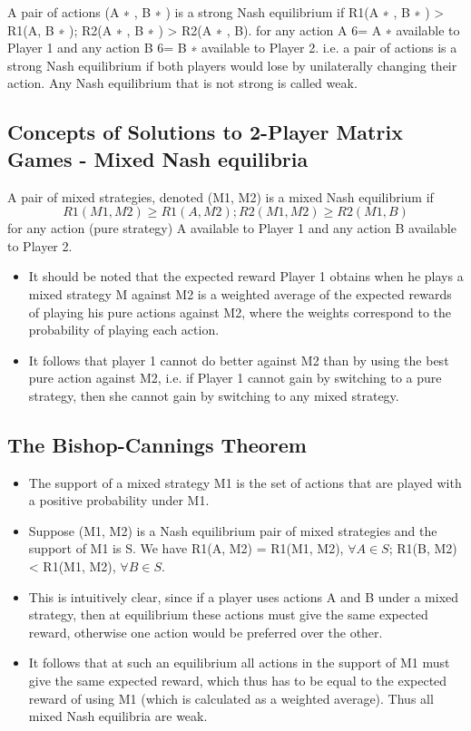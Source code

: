 \documentclass[]{article}
\begin{document}
	A pair of actions (A
	∗
	, B
	∗
	) is a strong Nash equilibrium if
	R1(A
	∗
	, B
	∗
	) > R1(A, B
	∗
	); R2(A
	∗
	, B
	∗
	) > R2(A
	∗
	, B).
	for any action A 6= A
	∗
	available to Player 1 and any action B 6= B
	∗
	available to Player 2.
	i.e. a pair of actions is a strong Nash equilibrium if both players
	would lose by unilaterally changing their action.
	Any Nash equilibrium that is not strong is called weak.
	\subsection{Concepts of Solutions to 2-Player Matrix Games - Mixed
		Nash equilibria}
	A pair of mixed strategies, denoted (M1, M2) is a mixed Nash
	equilibrium if
	\[R1(M1, M2) \geq R1(A, M2); R2(M1, M2) \geq R2(M1, B)\]
	for any action (pure strategy) A available to Player 1 and any
	action B available to Player 2.
	\begin{itemize}
		\item It should be noted that the expected reward Player 1 obtains when
		he plays a mixed strategy M against M2 is a weighted average of
		the expected rewards of playing his pure actions against M2, where
		the weights correspond to the probability of playing each action.
		\item It follows that player 1 cannot do better against M2 than by using
		the best pure action against M2, i.e. if Player 1 cannot gain by
		switching to a pure strategy, then she cannot gain by switching to
		any mixed strategy.
	\end{itemize}
	
	\subsection{The Bishop-Cannings Theorem}
	\begin{itemize}
		\item The support of a mixed strategy M1 is the set of actions that are
		played with a positive probability under M1.
		\item Suppose (M1, M2) is a Nash equilibrium pair of mixed strategies
		and the support of M1 is S. We have
		R1(A, M2) = R1(M1, M2), $\forall A  \in S$; R1(B, M2) < R1(M1, M2), $\forall B  \in S$.
		\item This is intuitively clear, since if a player uses actions A and B
		under a mixed strategy, then at equilibrium these actions must give
		the same expected reward, otherwise one action would be preferred
		over the other.
		\item It follows that at such an equilibrium all actions in the support of
		M1 must give the same expected reward, which thus has to be
		equal to the expected reward of using M1 (which is calculated as a
		weighted average). Thus all mixed Nash equilibria are weak.
	\end{itemize}
	
\end{document}
